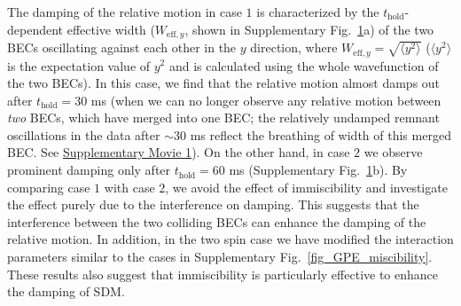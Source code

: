\documentclass[showpacs,preprintnumbers,amsmath,amssymb, superscriptaddress, aps, reprint]{revtex4-1}
\def\thold{t_{\text{hold}}}
\begin{document}
{{\begin{figure}[H]
\label{FigGPE_binary_singleCom_on_long}
\end{figure}
The damping of the relative motion in case $1$ is characterized by the $\thold$-dependent effective width ($W_{\text{eff},y}$, shown in Supplementary Fig.~\ref{FigGPE_binary_singleCom_on_long}a) of the two BECs oscillating against each other in the $y$ direction, where $W_{\text{eff},y}=\sqrt{\langle y^2\rangle}$ ($\langle y^2\rangle$ is the expectation value of $y^2$ and is calculated using the whole wavefunction of the two BECs). In this case, we find that the relative motion almost damps out after $\thold=30$ ms (when we can no longer observe any relative motion between \textit{two} BECs, which have merged into one BEC; the relatively undamped remnant oscillations in the data after $\sim 30$ ms reflect the breathing of width of this merged BEC. See \href{https://www.dropbox.com/s/crpu9r9voftgeue/single_on.gif?dl=0}{\hypertarget{anim1}{Supplementary Movie 1}}). On the other hand, in case $2$ we observe prominent damping only after $\thold=60$ ms (Supplementary Fig.~\ref{FigGPE_binary_singleCom_on_long}b). By comparing case $1$ with case $2$, we avoid the effect of immiscibility and investigate the effect purely due to the interference on damping. This suggests that the interference between the two colliding BECs can enhance the damping of the relative motion. 
In addition, in the two spin case we have modified the interaction parameters similar to the cases in Supplementary Fig.~\ref{fig_GPE_miscibility}. These results also suggest that immiscibility is particularly effective to enhance the damping of SDM.

}}
\end{document}
